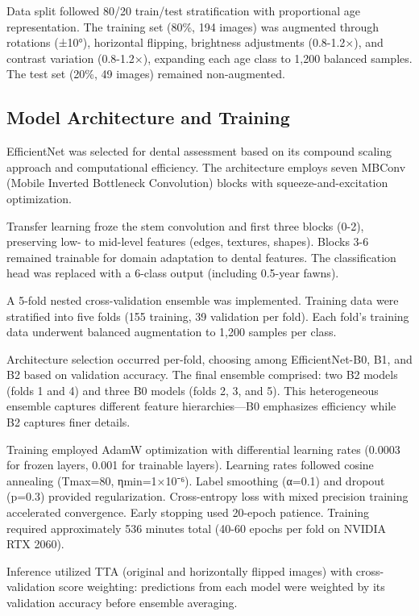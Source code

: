 \documentclass[11pt]{article}
\begin{document}
Data split followed 80/20 train/test stratification with proportional age representation. The training set (80\%, 194 images) was augmented through rotations (±10°), horizontal flipping, brightness adjustments (0.8-1.2×), and contrast variation (0.8-1.2×), expanding each age class to 1,200 balanced samples. The test set (20\%, 49 images) remained non-augmented.

\subsection{Model Architecture and Training}

EfficientNet \cite{tan2019efficientnet} was selected for dental assessment based on its compound scaling approach and computational efficiency. The architecture employs seven MBConv (Mobile Inverted Bottleneck Convolution) blocks with squeeze-and-excitation optimization.

Transfer learning froze the stem convolution and first three blocks (0-2), preserving low- to mid-level features (edges, textures, shapes). Blocks 3-6 remained trainable for domain adaptation to dental features. The classification head was replaced with a 6-class output (including 0.5-year fawns).

A 5-fold nested cross-validation ensemble was implemented. Training data were stratified into five folds (155 training, 39 validation per fold). Each fold's training data underwent balanced augmentation to 1,200 samples per class.

Architecture selection occurred per-fold, choosing among EfficientNet-B0, B1, and B2 based on validation accuracy. The final ensemble comprised: two B2 models (folds 1 and 4) and three B0 models (folds 2, 3, and 5). This heterogeneous ensemble captures different feature hierarchies—B0 emphasizes efficiency while B2 captures finer details.

Training employed AdamW optimization with differential learning rates (0.0003 for frozen layers, 0.001 for trainable layers). Learning rates followed cosine annealing (Tmax=80, ηmin=1×10⁻⁶). Label smoothing (α=0.1) and dropout (p=0.3) provided regularization. Cross-entropy loss with mixed precision training accelerated convergence. Early stopping used 20-epoch patience. Training required approximately 536 minutes total (40-60 epochs per fold on NVIDIA RTX 2060).

Inference utilized TTA (original and horizontally flipped images) with cross-validation score weighting: predictions from each model were weighted by its validation accuracy before ensemble averaging.
\end{document}
